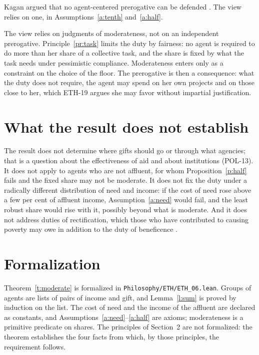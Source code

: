 \documentclass{situationist-preprint}
\begin{document}
\begin{objection}
Kagan argued that no agent-centered prerogative can be defended \citep{Kagan1989}. The view relies on one, in Assumptions~\ref{a:tenth} and~\ref{a:half}.
\end{objection}

\begin{reply}
The view relies on judgments of moderateness, not on an independent prerogative. Principle~\ref{pr:task} limits the duty by fairness: no agent is required to do more than her share of a collective task, and the share is fixed by what the task needs under pessimistic compliance. Moderateness enters only as a constraint on the choice of the floor. The prerogative is then a consequence: what the duty does not require, the agent may spend on her own projects and on those close to her, which ETH-19 argues she may favor without impartial justification.
\end{reply}

\section{What the result does not establish}

The result does not determine where gifts should go or through what agencies; that is a question about the effectiveness of aid and about institutions (POL-13). It does not apply to agents who are not affluent, for whom Proposition~\ref{p:half} fails and the fixed share may not be moderate. It does not fix the duty under a radically different distribution of need and income: if the cost of need rose above a few per cent of affluent income, Assumption~\ref{a:need} would fail, and the least robust share would rise with it, possibly beyond what is moderate. And it does not address duties of rectification, which those who have contributed to causing poverty may owe in addition to the duty of beneficence \citep{Pogge2002}.

\section{Formalization}

Theorem~\ref{t:moderate} is formalized in \nolinkurl{Philosophy/ETH/ETH_06.lean}. Groups of agents are lists of pairs of income and gift, and Lemma~\ref{l:sum} is proved by induction on the list. The cost of need and the income of the affluent are declared as constants, and Assumptions~\ref{a:need}--\ref{a:half} are axioms; moderateness is a primitive predicate on shares. The principles of Section~2 are not formalized: the theorem establishes the four facts from which, by those principles, the requirement follows.
\end{document}
